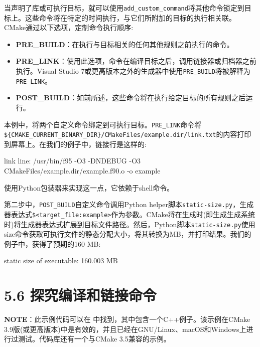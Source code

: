 
当声明了库或可执行目标，就可以使用\texttt{add\_custom\_command}将其他命令锁定到目标上。这些命令将在特定的时间执行，与它们所附加的目标的执行相关联。CMake通过以下选项，定制命令执行顺序:

\begin{itemize}
\item \textbf{PRE\_BUILD}：在执行与目标相关的任何其他规则之前执行的命令。

\item \textbf{PRE\_LINK}：使用此选项，命令在编译目标之后，调用链接器或归档器之前执行。Visual Studio 7或更高版本之外的生成器中使用\texttt{PRE\_BUILD}将被解释为\texttt{PRE\_LINK}。

\item \textbf{POST\_BUILD}：如前所述，这些命令将在执行给定目标的所有规则之后运行。

\end{itemize}

本例中，将两个自定义命令绑定到可执行目标。\texttt{PRE\_LINK}命令将\texttt{\$\{CMAKE\_CURRENT\_BINARY\_DIR\}/CMakeFiles/example.dir/link.txt}的内容打印到屏幕上。在我们的例子中，链接行是这样的:

\begin{codebox}[shell]
link line:
/usr/bin/f95 -O3 -DNDEBUG -O3 CMakeFiles/example.dir/example.f90.o -o example
\end{codebox}

使用Python包装器来实现这一点，它依赖于shell命令。

第二步中，\texttt{POST\_BUILD}自定义命令调用Python helper脚本\texttt{static-size.py}，生成器表达式\texttt{\$<target\_file:example>}作为参数。CMake将在生成时(即生成生成系统时)将生成器表达式扩展到目标文件路径。然后，Python脚本\texttt{static-size.py}使用size命令获取可执行文件的静态分配大小，将其转换为MB，并打印结果。我们的例子中，获得了预期的160 MB:

\begin{codebox}[shell]
static size of executable:
160.003 MB
\end{codebox}


\section{5.6 探究编译和链接命令}

\begin{myInfoBox}
\textbf{NOTE}：此示例代码可以在  中找到，其中包含一个C++例子。该示例在CMake 3.9版(或更高版本)中是有效的，并且已经在GNU/Linux、macOS和Windows上进行过测试。代码库还有一个与CMake 3.5兼容的示例。
\end{myInfoBox}

